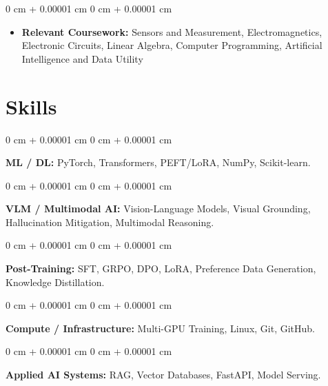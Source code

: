 \documentclass[10pt, letterpaper]{article}
\newenvironment{highlights}{
    \begin{itemize}[
        topsep=0.10 cm,
        parsep=0.10 cm,
        partopsep=0pt,
        itemsep=0pt,
        leftmargin=0 cm + 10pt
    ]
}{
    \end{itemize}
} %
\newenvironment{onecolentry}{
    \begin{adjustwidth}{
        0 cm + 0.00001 cm
    }{
        0 cm + 0.00001 cm
    }
}{
    \end{adjustwidth}
} %
\begin{document}
        \vspace{0.10 cm}
        \begin{onecolentry}
            \begin{highlights}
                \item \textbf{Relevant Coursework:} Sensors and Measurement, Electromagnetics, Electronic Circuits, Linear Algebra, Computer Programming, Artificial Intelligence and Data Utility
            \end{highlights}
        \end{onecolentry}

    \section{Skills}
        \begin{onecolentry}
        \textbf{ML / DL:} PyTorch, Transformers, PEFT/LoRA, NumPy, Scikit-learn.
        \end{onecolentry}

        \vspace{0.12 cm}

        \begin{onecolentry}
        \textbf{VLM / Multimodal AI:} Vision-Language Models, Visual Grounding, Hallucination Mitigation, Multimodal Reasoning.
        \end{onecolentry}

        \vspace{0.12 cm}

        \begin{onecolentry}
        \textbf{Post-Training:} SFT, GRPO, DPO, LoRA, Preference Data Generation, Knowledge Distillation.
        \end{onecolentry}

        \vspace{0.12 cm}

        \begin{onecolentry}
        \textbf{Compute / Infrastructure:} Multi-GPU Training, Linux, Git, GitHub.
        \end{onecolentry}

        \vspace{0.12 cm}

        \begin{onecolentry}
        \textbf{Applied AI Systems:} RAG, Vector Databases, FastAPI, Model Serving.
        \end{onecolentry}

        \vspace{0.12 cm}
\end{document}
